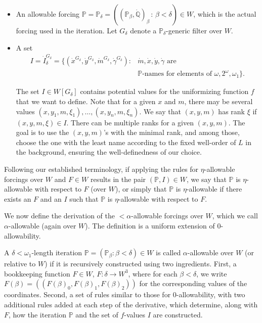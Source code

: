 \documentclass[a4paper,11pt]{article}
\newcommand{\forceP}{\mathbb{P}}
\newcommand{\forceQ}{\mathbb{Q}}
\begin{document}
\begin{itemize}
\item An allowable forcing \( \forceP = \forceP_{\delta} = ((\forceP_{\beta}, \dot{\forceQ})_{\beta} \, : \, \beta < \delta) \in W \), which is the actual forcing used in the iteration. Let \( G_{\delta} \) denote a \( \forceP_{\delta} \)-generic filter over \( W \).
  
\item A set
\begin{align*}
    I = \dot{I}_{\delta}^{G_{\delta}} =  \{ (\dot{x}^{G_{\delta}}, \dot{y}^{G_{\delta}}, \dot{m}^{G_{\delta}}, \dot{\gamma}^{G_{\delta}}) : & \dot{m} , \dot{x}, \dot{y}, \dot{\gamma} \text{ are } \\& \forceP \text{-names for elements of } \omega, 2^{\omega}, \omega_1 \}.
\end{align*}
    

 The set \( I \in W[G_{\delta}] \) contains potential values for the uniformizing function \( f \) that we want to define. Note that for a given \( x \) and \( m \), there may be several values \( (x, y_1, m, \xi_1), \dots, (x, y_n, m, \xi_n) \). We say that \( (x, y, m) \) has rank \( \xi \) if \( (x, y, m, \xi) \in I \). There can be multiple ranks for a given \( (x, y, m) \). The goal is to use the \( (x, y, m) \)'s with the minimal rank, and among those, choose the one with the least name according to the fixed well-order of $L$ in the background, ensuring the well-definedness of our choice.
\end{itemize}

Following our established terminology, if applying the rules for \( \eta \)-allowable forcings over \( W \) and \( F \in W \) results in the pair \( (\forceP, I) \in W \), we say that \( \forceP \) is \( \eta \)-allowable with respect to \( F \) (over \( W \)), or simply that \( \forceP \) is \( \eta \)-allowable if there exists an \( F \) and an \( I \) such that \( \forceP \) is \( \eta \)-allowable with respect to \( F \).


We now define the derivation of the \( <\alpha \)-allowable forcings over \( W \), which we call \( \alpha \)-allowable (again over \( W \)). The definition is a uniform extension of 0-allowability. 

A \( \delta < \omega_1 \)-length iteration \( \forceP = (\forceP_{\beta} : \beta < \delta) \in W \) is called \( \alpha \)-allowable over \( W \) (or relative to \( W \)) if it is recursively constructed using two ingredients. First, a bookkeeping function \( F \in W \), \( F : \delta \to W^3 \), where for each \( \beta < \delta \), we write \( F(\beta) = ((F(\beta)_0, F(\beta)_1, F(\beta)_2)) \) for the corresponding values of the coordinates. Second, a set of rules similar to those for 0-allowability, with two additional rules added at each step of the derivative, which determine, along with \( F \), how the iteration \( \forceP \) and the set of \( f \)-values \( I \) are constructed.
\end{document}
